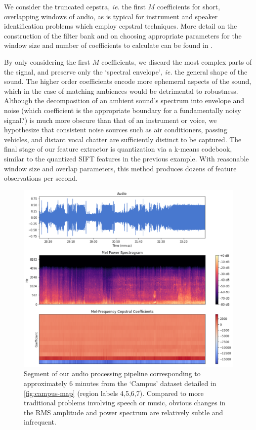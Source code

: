 We consider the truncated cepstra, \emph{ie.} the first $M$ coefficients for short, overlapping windows of audio, as is typical for instrument and speaker identification problems which employ cepstral techniques. More detail on the construction of the filter bank and on choosing appropriate parameters for the window size and number of coefficients to calculate can be found in \citep{Sturm2010}.

By only considering the first $M$ coefficients, we discard the most complex parts of the signal, and preserve only the `spectral envelope', \emph{ie.} the general shape of the sound. The higher order coefficients encode more ephemeral aspects of the sound, which in the case of matching ambiences would be detrimental to robustness.
Although the decomposition of an ambient sound's spectrum into envelope and noise (which coefficient is the appropriate boundary for a fundamentally noisy signal?) is much more obscure than that of an instrument or voice, we hypothesize that consistent noise sources such as air conditioners, passing vehicles, and distant vocal chatter are sufficiently distinct to be captured.  The final stage of our feature extractor is quantization via a k-means codebook, similar to the quantized SIFT features in the previous example. With reasonable window size and overlap parameters, this method produces dozens of feature observations per second.

\begin{figure}
    \centering
    \includegraphics[width=\textwidth]{figures/audio/audio_processing.png}
    \caption{Segment of our audio processing pipeline corresponding to approximately 6 minutes from the `Campus' dataset detailed in \ref{fig:campus-map} (region labels 4,5,6,7). Compared to more traditional problems involving speech or music, obvious changes in the RMS amplitude and power spectrum are relatively subtle and infrequent.}
    \label{fig:audio-pipe}
\end{figure}

